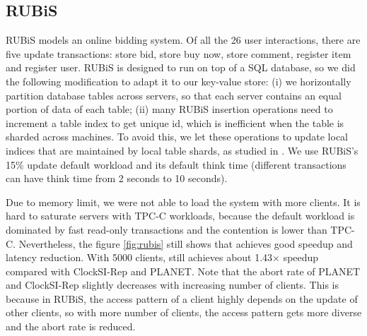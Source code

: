 \subsection{RUBiS}
RUBiS \cite{rubis} models an online bidding system. Of all the 26 user interactions, there are five update transactions: store bid, store buy now, store comment, register item and register user. RUBiS is designed to run on top of a SQL database, so we did the following modification to adapt it to our key-value store: (i) we horizontally partition database tables across servers, so that each server contains an equal portion of data of each table; (ii) many RUBiS insertion operations need to increment a table index to get unique id, which is inefficient when the table is sharded across machines. To avoid this, we let these operations to update local indices that are maintained by local table shards, as studied in \cite{cecchet2008middleware}. We use RUBiS's 15\% update default workload and its default think time (different transactions can have think time from 2 seconds to 10 seconds).

Due to memory limit, we were not able to load the system with more clients. It is hard to saturate servers with TPC-C workloads, because the default workload is dominated by fast read-only transactions and the contention is lower than TPC-C. Nevertheless, the figure \ref{fig:rubis} still shows that \specula achieves good speedup and latency reduction. With 5000 clients, \specula still achieves about 1.43$\times$ speedup compared with ClockSI-Rep and PLANET. Note that the abort rate of PLANET and ClockSI-Rep slightly decreases with increasing number of clients. This is because in RUBiS, the access pattern of a client highly depends on the update of other clients, so with more number of clients, the access pattern gets more diverse and the abort rate is reduced.

